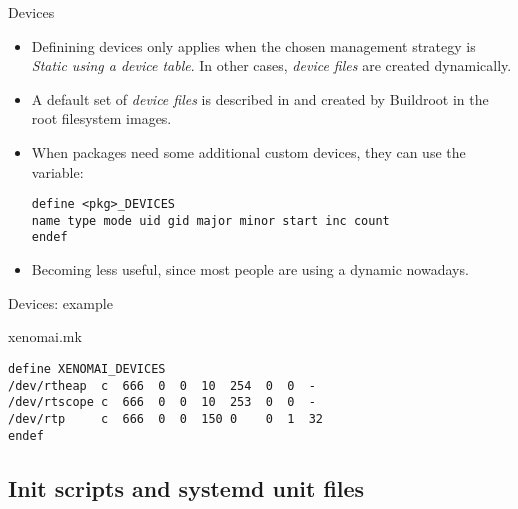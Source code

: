 \begin{frame}[fragile]{Devices}
  \begin{itemize}
  \item Definining devices only applies when the chosen 
    management strategy is {\em Static using a device table}. In other
    cases, {\em device files} are created dynamically.
  \item A default set of {\em device files} is described in
     and created by Buildroot in the
    root filesystem images.
  \item When packages need some additional custom devices, they can
    use the  variable:
{\small
  \begin{block}{}
\begin{verbatim}
define <pkg>_DEVICES
name type mode uid gid major minor start inc count
endef
\end{verbatim}
  \end{block}}
\item Becoming less useful, since most people are using a dynamic
   nowadays.
  \end{itemize}
\end{frame}

\begin{frame}[fragile]{Devices: example}

    \begin{block}{xenomai.mk}
      \begin{verbatim}
define XENOMAI_DEVICES
/dev/rtheap  c  666  0  0  10  254  0  0  -
/dev/rtscope c  666  0  0  10  253  0  0  -
/dev/rtp     c  666  0  0  150 0    0  1  32
endef
      \end{verbatim}
    \end{block}

\end{frame}

\subsection{Init scripts and systemd unit files}

